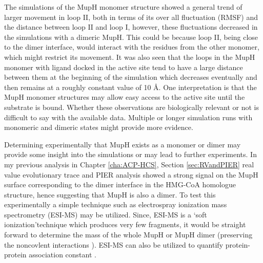 	The simulations of the MupH monomer structure showed a general trend of larger movement in loop II, both in terms of its over all fluctuation (RMSF) and the distance between loop II and loop I, however, these fluctuations decreased in the simulations with a dimeric MupH. This could be because loop II, being close to the dimer interface, would interact with the residues from the other monomer, which might restrict its movement. It was also seen that the loops in the MupH monomer with ligand docked in the active site tend to have a large distance between them at the beginning of the simulation which decreases eventually and then remains at a roughly constant value of 10 \AA. One interpretation is that the MupH monomer structures may allow easy access to the active site until the substrate is bound. Whether these observations are biologically relevant or not is difficult to say with the available data. Multiple or longer simulation runs with monomeric and dimeric states might provide more evidence.
	
	Determining experimentally that MupH exists as a monomer or dimer may provide some insight into the simulations or may lead to further experiments.  In my previous analysis in Chapter \ref{cha:ACP-HCS}, Section \ref{sec:RVandPIER} real value evolutionary trace and PIER analysis showed a strong signal on the MupH surface corresponding to the dimer interface in the HMG-CoA homologue structure, hence suggesting that MupH is also a dimer. To test this experimentally a simple technique such as electrospray ionization mass spectrometry (ESI-MS) may be utilized. Since, ESI-MS is a \textquoteleft soft ionization\textquoteright technique which produces very few fragments, it would be straight forward to determine the mass of the whole MupH or MupH dimer (preserving the noncovlent interactions \parencite{Huang1993}). ESI-MS can also be utilized to quantify protein-protein association constant \parencite{BoeriErba2011}.